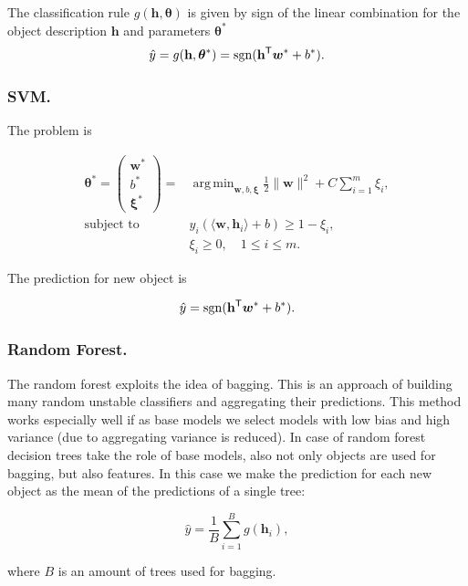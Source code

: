 \documentclass{llncs}
\DeclareMathOperator{\sgn}{\mathop{sgn}}
\DeclareMathOperator*{\argmin}{arg\,min}
\newcommand{\T}{{\mbox{\scriptsize\sffamily\upshape\mdseries T}}}
\begin{document}
The classification rule $g(\mathbf{h}, \bm{\theta})$ is given by sign of the linear combination for the object description $\mathbf{h}$ and parameters $\bm{\theta}^*$
\begin{equation*}
\hat{y} = g(\mathbf{h}, \bm{\theta}^*) = \sgn(\mathbf{h}^{\T} \bm{w}^* + b^*).
\end{equation*}

\subsubsection{SVM.}
The problem is

\begin{align*}
\bm{\theta}^*  = \begin{pmatrix}
\bm{w^*} \\ b^* \\ \bm{\xi}^*
\end{pmatrix}= &\argmin_{\bm{w}, b, \bm{\xi}}  \frac{1}{2} \|\bm{w}\|^2 + C\sum_{i=1}^{m} \xi_i,\\
\mbox{subject to} \quad &y_i (\langle \bm{w}, \mathbf{h}_i \rangle + b) \geq 1 - \xi_i,\\
&\xi_i \geq 0, \quad 1 \leq i \leq m.
\end{align*}

The prediction for new object is

\begin{equation*}
\hat{y} = \sgn (\mathbf{h}^{\T} \bm{w}^* + b^*).
\end{equation*}

\subsubsection{Random Forest.}
The random forest exploits the idea of bagging. This is an approach of building many random unstable classifiers and aggregating their predictions. This method works especially well if as base models we select models with low bias and high variance (due to aggregating variance is reduced). In case of random forest decision trees take the role of base models, also not only objects are used for bagging, but also features. In this case we make the prediction for each new object as the mean of the predictions of a single tree:

\begin{equation*}
\hat{y} = \frac{1}{B} \sum_{i=1}^{B} g(\mathbf{h}_i),
\end{equation*}

where $B$ is an amount of trees used for bagging.
\end{document}
